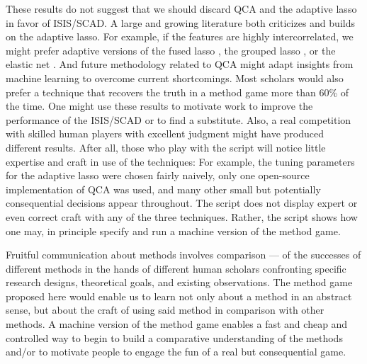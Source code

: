 \documentclass[12pt]{article}
\begin{document}
These results do not suggest that we should discard QCA and the adaptive lasso
in favor of ISIS/SCAD.  A large and growing literature both criticizes and
builds on the adaptive lasso. For example, if the features are highly
intercorrelated, we might prefer adaptive versions of the fused lasso
\citep{rinaldo2009properties}, the grouped lasso \citep{wang2008note}, or the
elastic net \citep{ghosh2011grouped, zou2004regression}. And future
methodology related to QCA might adapt insights from machine learning to
overcome current shortcomings.  Most scholars would also prefer a technique
that recovers the truth in a method game more than 60\% of the time. One might
use these results to motivate work to improve the performance of the ISIS/SCAD
or to find a substitute. Also, a real competition with skilled human players
with excellent judgment might have produced different results.  After all,
those who play with the script will notice little expertise and craft in use
of the techniques: For example, the tuning parameters for the adaptive lasso
were chosen fairly naively, only one open-source implementation of QCA was
used, and many other small but potentially consequential decisions appear
throughout.  The script does not display expert or even correct craft with any
of the three techniques.  Rather, the script shows how one may, in principle
specify and run a machine version of the method game.

Fruitful communication about methods involves comparison --- of the successes
of different methods in the hands of different human scholars confronting
specific research designs, theoretical goals, and existing observations. The
method game proposed here would enable us to learn not only about a method in
an abstract sense, but about the craft of using said method in comparison with
other methods. A machine version of the method game enables a fast and cheap
and controlled way to begin to build a comparative understanding of the
methods and/or to motivate people to engage the fun of a real but
consequential game.





\end{document}
